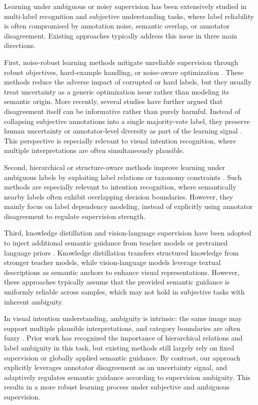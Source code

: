 Learning under ambiguous or noisy supervision has been extensively studied in multi-label recognition and subjective understanding tasks, where label reliability is often compromised by annotation noise, semantic overlap, or annotator disagreement. 
Existing approaches typically address this issue in three main directions.

First, noise-robust learning methods mitigate unreliable supervision through robust objectives, hard-example handling, or noise-aware optimization \cite{lin_focal_2020, shrivastava_training_2016, ye_collaborative_2022, ridnik_asymmetric_2021}. 
These methods reduce the adverse impact of corrupted or hard labels, but they usually treat uncertainty as a generic optimization issue rather than modeling its semantic origin. More recently, several studies have further argued that disagreement itself can be informative rather than purely harmful. Instead of collapsing subjective annotations into a single majority-vote label, they preserve human uncertainty or annotator-level diversity as part of the learning signal \cite{peterson_human_2019, mostafazadeh_davani_dealing_2022, weerasooriya_disagreement_2023, weerasooriya_subjective_2023}. This perspective is especially relevant to visual intention recognition, where multiple interpretations are often simultaneously plausible.

Second, hierarchical or structure-aware methods improve learning under ambiguous labels by exploiting label relations or taxonomy constraints \cite{zhang_use_2022, shi_learnable_2023}. 
Such methods are especially relevant to intention recognition, where semantically nearby labels often exhibit overlapping decision boundaries. 
However, they mainly focus on label dependency modeling, instead of explicitly using annotator disagreement to regulate supervision strength.

Third, knowledge distillation and vision-language supervision have been adopted to inject additional semantic guidance from teacher models or pretrained language priors \cite{touvron_training_2021, radford_learning_2021}. 
Knowledge distillation transfers structured knowledge from stronger teacher models, while vision-language models leverage textual descriptions as semantic anchors to enhance visual representations. 
However, these approaches typically assume that the provided semantic guidance is uniformly reliable across samples, which may not hold in subjective tasks with inherent ambiguity.

In visual intention understanding, ambiguity is intrinsic: the same image may support multiple plausible interpretations, and category boundaries are often fuzzy \cite{jia_intentonomy_2021, shi_learnable_2023}. 
Prior work has recognized the importance of hierarchical relations and label ambiguity in this task, but existing methods still largely rely on fixed supervision or globally applied semantic guidance. 
By contrast, our approach explicitly leverages annotator disagreement as an uncertainty signal, and adaptively regulates semantic guidance according to supervision ambiguity. 
This results in a more robust learning process under subjective and ambiguous supervision.